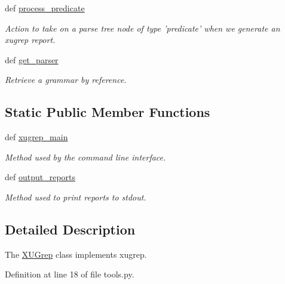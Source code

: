 \begin{DoxyCompactItemize}
\item 
def \hyperlink{classxutools_1_1tools_1_1_x_u_grep_a1e35a8a1e413fab40282db48e6054ab9}{process\-\_\-predicate}
\begin{DoxyCompactList}\small\item\em Action to take on a parse tree node of type 'predicate' when we generate an xugrep report. \end{DoxyCompactList}\item 
def \hyperlink{classxutools_1_1tools_1_1_x_u_grep_acace7ff361d11b43df726e3141e30640}{get\-\_\-parser}
\begin{DoxyCompactList}\small\item\em Retrieve a grammar by reference. \end{DoxyCompactList}\end{DoxyCompactItemize}
\subsection*{Static Public Member Functions}
\begin{DoxyCompactItemize}
\item 
def \hyperlink{classxutools_1_1tools_1_1_x_u_grep_a987ef6d3a9436b53eb7073510207deba}{xugrep\-\_\-main}
\begin{DoxyCompactList}\small\item\em Method used by the command line interface. \end{DoxyCompactList}\item 
def \hyperlink{classxutools_1_1tools_1_1_x_u_grep_a63e2556cd54971d3f185f0213f453a23}{output\-\_\-reports}
\begin{DoxyCompactList}\small\item\em Method used to print reports to stdout. \end{DoxyCompactList}\end{DoxyCompactItemize}


\subsection{Detailed Description}
The \hyperlink{classxutools_1_1tools_1_1_x_u_grep}{X\-U\-Grep} class implements xugrep. 



Definition at line 18 of file tools.\-py.



